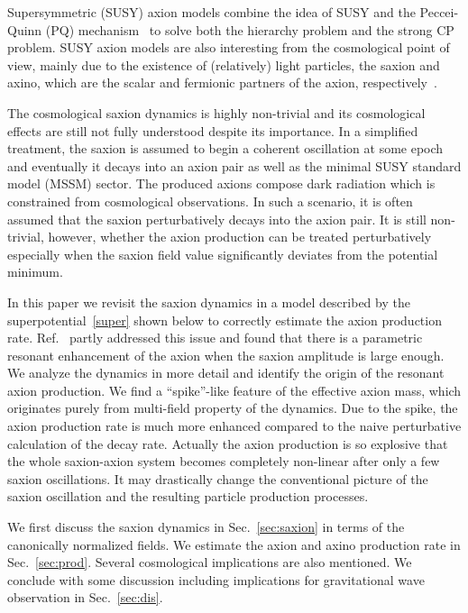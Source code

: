 \documentclass[12pt, a4paper]{article}
\begin{document}
Supersymmetric (SUSY) axion models combine the idea of SUSY 
and the Peccei-Quinn (PQ) mechanism~\cite{Peccei:1977hh} 
to solve both the hierarchy problem and the strong CP problem.
SUSY axion models are also interesting from the cosmological point of view,
mainly due to the existence of (relatively) light particles, the saxion and axino,
which are the scalar and fermionic partners of the axion, respectively~\cite{Kim:1983ia,Rajagopal:1990yx,Kim:1992eu,Lyth:1993zw,Chun:1995hc,Choi:1996vz,Kasuya:1996ns,Asaka:1998ns,Covi:2001nw,Brandenburg:2004du,Strumia:2010aa,Kawasaki:2007mk,Kawasaki:2008jc,Kawasaki:2010gv,Chun:2011zd,Bae:2011jb,Bae:2011iw,Jeong:2012np,Nakayama:2012zc,Moroi:2012vu,Choi:2012zna,Kawasaki:2013ae,Moroi:2013tea,Bae:2013hma,Co:2017orl}.

The cosmological saxion dynamics is highly non-trivial and its cosmological effects 
are still not fully understood despite its importance.
In a simplified treatment, the saxion is assumed to begin a coherent oscillation at some epoch 
and eventually it decays into an axion pair as well as the minimal SUSY standard model (MSSM) sector.
The produced axions compose dark radiation which is constrained from cosmological observations.
In such a scenario, it is often assumed that the saxion perturbatively decays into the axion pair.
It is still non-trivial, however, whether the axion production can be treated perturbatively especially 
when the saxion field value significantly deviates from the potential minimum.

In this paper we revisit the saxion dynamics in a model described by the superpotential~\eqref{super} 
shown below to correctly estimate the axion production rate.
Ref.~\cite{Kasuya:1996ns} partly addressed this issue and found that there is a parametric resonant enhancement of the axion
when the saxion amplitude is large enough.
We analyze the dynamics in more detail and identify the origin of the resonant axion production.
We find a ``spike''-like feature of the effective axion mass, 
which originates purely from multi-field property of the dynamics.
Due to the spike, the axion production rate is much more enhanced 
compared to the naive perturbative calculation of the decay rate.
Actually the axion production is so explosive that the whole saxion-axion system becomes completely non-linear
after only a few saxion oscillations.
It may drastically change the conventional picture of the saxion oscillation and the resulting particle production processes.

We first discuss the saxion dynamics in Sec.~\ref{sec:saxion}
in terms of the canonically normalized fields.
We estimate the axion and axino production rate in Sec.~\ref{sec:prod}.
Several cosmological implications are also mentioned.
We conclude with some discussion including implications for gravitational wave observation 
in Sec.~\ref{sec:dis}.
\end{document}

